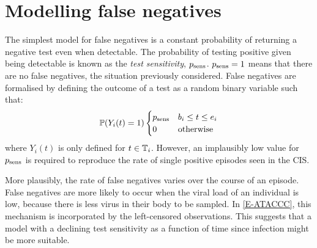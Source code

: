 \documentclass[thesis.tex]{subfiles}
\begin{document}
\section{Modelling false negatives} \label{imperf-test:sec:simulate}

The simplest model for false negatives is a constant probability of returning a negative test even when detectable.
The probability of testing positive given being detectable is known as the \emph{test sensitivity}, $p_\text{sens}$.
$p_\text{sens} = 1$ means that there are no false negatives, the situation previously considered.
False negatives are formalised by defining the outcome of a test as a random binary variable such that:
\begin{equation}
  \operatorname{\mathbb{P}}(Y_i(t) = 1) \begin{cases}
      p_\text{sens} &b_i \leq t \leq e_i \\
      0 &\text{otherwise}
  \end{cases} 
\end{equation}
where $Y_i(t)$ is only defined for $t \in \mathbb{T}_i$.
However, an implausibly low value for $p_\text{sens}$ is required to reproduce the rate of single positive episodes seen in the CIS.

More plausibly, the rate of false negatives varies over the course of an episode.
False negatives are more likely to occur when the viral load of an individual is low, because there is less virus in their body to be sampled.
In \cref{E-ATACCC}, this mechanism is incorporated by the left-censored observations.
This suggests that a model with a declining test sensitivity as a function of time since infection might be more suitable.
\end{document}
